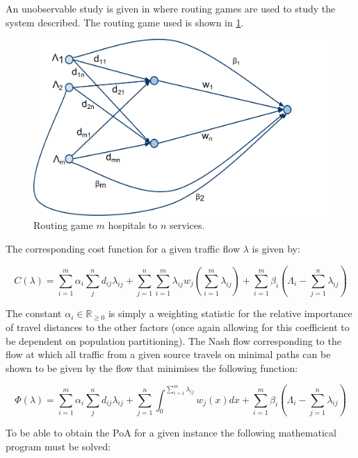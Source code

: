 \documentclass[a4paper,11pt]{article}
\begin{document}
An unobservable study is given in \cite{Knight2013} where routing games \cite{Roughgarden2005} are used to study the system described.
The routing game used is shown in \ref{fig:routinggame}.

\begin{figure}[!hbtp]
\begin{center}
\includegraphics[width=.7\textwidth]{./Images/Hospital_Routing_Game.pdf}
\end{center}
\caption{Routing game $m$ hospitals to $n$ services.}\label{fig:routinggame}
\end{figure}

The corresponding cost function for a given traffic flow $\lambda$ is given by:

\begin{equation}
C(\lambda)=\sum_{i=1}^m\alpha_i\sum_{j}^nd_{ij}\lambda_{ij}+\sum_{j=1}^n\sum_{i=1}^m\lambda_{ij}w_j\left(\sum_{i=1}^m\lambda_{ij}\right)+\sum_{i=1}^m\beta_i\left(\Lambda_i-\sum_{j=1}^n\lambda_{ij}\right)
\label{C}\end{equation}

The constant $\alpha_i\in\mathbb{R}_{\geq0}$ is simply a weighting statistic for the relative importance of travel distances to the other factors (once again allowing for this coefficient to be dependent on population partitioning).
The Nash flow corresponding to the flow at which all traffic from a given source travels on minimal paths can be shown to be given by the flow that minimises the following function:

\begin{equation}
\Phi(\lambda)=\sum_{i=1}^m\alpha_i\sum_{j}^nd_{ij}\lambda_{ij}+\sum_{j=1}^n\int_0^{\sum_{i=1}^m\lambda_{ij}}w_j(x)dx+\sum_{i=1}^m\beta_i\left(\Lambda_i-\sum_{j=1}^n\lambda_{ij}\right)
\label{Phi}\end{equation}

To be able to obtain the PoA for a given instance the following mathematical program must be solved:
\end{document}

